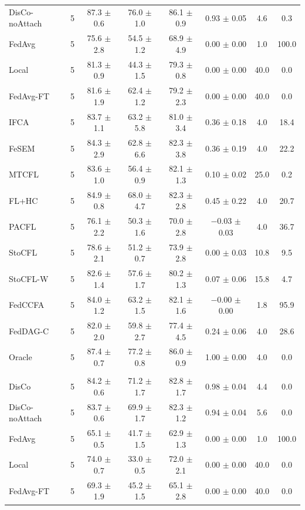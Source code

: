{{\begin{tabular}{l r c c c c c c}
DisCo-noAttach & 5 & 87.3 $\pm$ 0.6 & 76.0 $\pm$ 1.0 & 86.1 $\pm$ 0.9 & 0.93 $\pm$ 0.05 & 4.6 & 0.3 \\
FedAvg & 5 & 75.6 $\pm$ 2.8 & 54.5 $\pm$ 1.2 & 68.9 $\pm$ 4.9 & 0.00 $\pm$ 0.00 & 1.0 & 100.0 \\
Local & 5 & 81.3 $\pm$ 0.9 & 44.3 $\pm$ 1.5 & 79.3 $\pm$ 0.8 & 0.00 $\pm$ 0.00 & 40.0 & 0.0 \\
FedAvg-FT & 5 & 81.6 $\pm$ 1.9 & 62.4 $\pm$ 1.2 & 79.2 $\pm$ 2.3 & 0.00 $\pm$ 0.00 & 40.0 & 0.0 \\
IFCA & 5 & 83.7 $\pm$ 1.1 & 63.2 $\pm$ 5.8 & 81.0 $\pm$ 3.4 & 0.36 $\pm$ 0.18 & 4.0 & 18.4 \\
FeSEM & 5 & 84.3 $\pm$ 2.9 & 62.8 $\pm$ 6.6 & 82.3 $\pm$ 3.8 & 0.36 $\pm$ 0.19 & 4.0 & 22.2 \\
MTCFL & 5 & 83.6 $\pm$ 1.0 & 56.4 $\pm$ 0.9 & 82.1 $\pm$ 1.3 & 0.10 $\pm$ 0.02 & 25.0 & 0.2 \\
FL+HC & 5 & 84.9 $\pm$ 0.8 & 68.0 $\pm$ 4.7 & 82.3 $\pm$ 2.8 & 0.45 $\pm$ 0.22 & 4.0 & 20.7 \\
PACFL & 5 & 76.1 $\pm$ 2.2 & 50.3 $\pm$ 1.6 & 70.0 $\pm$ 2.8 & $-$0.03 $\pm$ 0.03 & 4.0 & 36.7 \\
StoCFL & 5 & 78.6 $\pm$ 2.1 & 51.2 $\pm$ 0.7 & 73.9 $\pm$ 2.8 & 0.00 $\pm$ 0.03 & 10.8 & 9.5 \\
StoCFL-W & 5 & 82.6 $\pm$ 1.4 & 57.6 $\pm$ 1.7 & 80.2 $\pm$ 1.3 & 0.07 $\pm$ 0.06 & 15.8 & 4.7 \\
FedCCFA & 5 & 84.0 $\pm$ 1.2 & 63.2 $\pm$ 1.5 & 82.1 $\pm$ 1.6 & $-$0.00 $\pm$ 0.00 & 1.8 & 95.9 \\
FedDAG-C & 5 & 82.0 $\pm$ 2.0 & 59.8 $\pm$ 2.7 & 77.4 $\pm$ 4.5 & 0.24 $\pm$ 0.06 & 4.0 & 28.6 \\
Oracle & 5 & 87.4 $\pm$ 0.7 & 77.2 $\pm$ 0.8 & 86.0 $\pm$ 0.9 & 1.00 $\pm$ 0.00 & 4.0 & 0.0 \\
\addlinespace
\multicolumn{8}{l}{\textit{EMNIST rotation}} \\
DisCo & 5 & 84.2 $\pm$ 0.6 & 71.2 $\pm$ 1.7 & 82.8 $\pm$ 1.7 & 0.98 $\pm$ 0.04 & 4.4 & 0.0 \\
DisCo-noAttach & 5 & 83.7 $\pm$ 0.6 & 69.9 $\pm$ 1.7 & 82.3 $\pm$ 1.2 & 0.94 $\pm$ 0.04 & 5.6 & 0.0 \\
FedAvg & 5 & 65.1 $\pm$ 0.5 & 41.7 $\pm$ 1.5 & 62.9 $\pm$ 1.3 & 0.00 $\pm$ 0.00 & 1.0 & 100.0 \\
Local & 5 & 74.0 $\pm$ 0.7 & 33.0 $\pm$ 0.5 & 72.0 $\pm$ 2.1 & 0.00 $\pm$ 0.00 & 40.0 & 0.0 \\
FedAvg-FT & 5 & 69.3 $\pm$ 1.9 & 45.2 $\pm$ 1.5 & 65.1 $\pm$ 2.8 & 0.00 $\pm$ 0.00 & 40.0 & 0.0 \\

\end{tabular}}}
